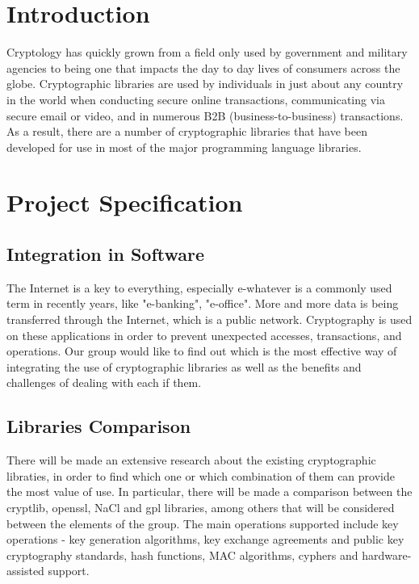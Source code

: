 \documentclass[a4paper]{article}
\begin{document}
\newpage

\section{Introduction}

Cryptology has quickly grown from a field only used by government and military agencies to being one that impacts the day to day lives of consumers across the globe. Cryptographic libraries are used by individuals in just about any country in the world when conducting secure online transactions, communicating via secure email or video, and in numerous B2B (business-to-business) transactions. As a result, there are a number of cryptographic libraries that have been developed for use in most of the major programming language libraries.\cite{tech-faq}
 
\section{Project Specification}
\subsection{Integration in Software}
The Internet is a key to everything, especially e-whatever is a commonly used term in recently years, like "e-banking", "e-office". More and more data is being transferred through the Internet, which is a public network. Cryptography is used on these applications in order to prevent unexpected accesses, transactions, and operations. Our group would like to find out which is the most effective way of integrating the use of cryptographic libraries as well as the benefits and challenges of dealing with each if them.   

\subsection{Libraries Comparison}
There will be made an extensive research about the existing cryptographic libraties, in order to find which one or which combination of them can provide the most value of use. In particular, there will be made a comparison between the cryptlib\cite{cryptlib}, openssl\cite{openssl}, NaCl\cite{nacl} and gpl\cite{gnupg} libraries, among others that will be considered between the elements of the group. The main operations supported include key operations - key generation algorithms, key exchange agreements and public key cryptography standards, hash functions, MAC algorithms, cyphers and hardware-assisted support. 
\end{document}

